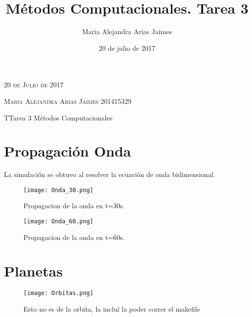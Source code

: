 \documentclass{article}
\author{Maria Alejandra Arias Jaimes}
\date{20 de julio de 2017}
\title{Métodos Computacionales. Tarea 3}
\newcommand{\JournalIssue}[1]{%
                \hfill \textsc{20 de Julio de 2017}
                \par \normalsize \normalfont}
\newcommand{\JournalName}[1]{%
                \begin{center}
                        \Huge \usefont{T1}{m}{n}
                        #1%
                \end{center}
                \par \normalsize \normalfont}
\newcommand{\NewsAuthor}[1]{%
                        \hfill \textsc{Maria Alejandra Arias Jaimes 201415329}
                        \par \normalsize \normalfont}
\begin{document}
\JournalIssue{1}
\NewsAuthor{}
\JournalName{ TTarea 3 Métodos Computacionales}

\section{Propagación Onda}

La simulación se obtuvo al resolver la ecuación de onda bidimensional.

\begin{figure}[h!]
\centering
\texttt{[image: Onda\_30.png]}
\caption{Propagacion de la onda en t=30s.}
\texttt{[image: Onda\_60.png]}
\caption{Propagacion de la onda en t=60s.}
\end{figure}

 
\section{Planetas}



\begin{figure}[h!]
\centering
\texttt{[image: Orbitas.png]}
\caption{Esto no es de la orbita, la incluí la poder correr el makefile}

\end{figure}
\end{document}
